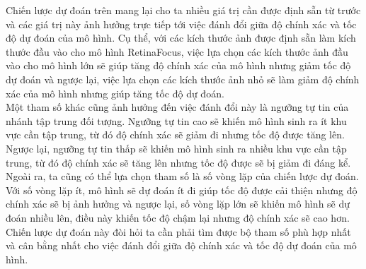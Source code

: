 {    \noindent
    Chiến lược dự đoán trên mang lại cho ta nhiều giá trị cần được định sẵn từ trước và các giá trị này ảnh hưởng trực tiếp tới việc đánh đổi giữa độ chính xác và tốc độ dự đoán của mô hình.
    Cụ thể, với các kích thước ảnh được định sẵn làm kích thước đầu vào cho mô hình RetinaFocus, việc lựa chọn các kích thước ảnh đầu vào cho mô hình lớn sẽ giúp tăng độ chính xác của mô hình nhưng giảm tốc độ dự đoán và ngược lại, việc lựa chọn các kích thước ảnh nhỏ sẽ làm giảm độ chính xác của mô hình nhưng giúp tăng tốc độ dự đoán. \\
    Một tham số khác cũng ảnh hưởng đến việc đánh đổi này là ngưỡng tự tin của nhánh tập trung đối tượng.
    Ngưỡng tự tin cao sẽ khiến mô hình sinh ra ít khu vực cần tập trung, từ đó độ chính xác sẽ giảm đi nhưng tốc độ được tăng lên.
    Ngược lại, ngưỡng tự tin thấp sẽ khiến mô hình sinh ra nhiều khu vực cần tập trung, từ đó độ chính xác sẽ tăng lên nhưng tốc độ được sẽ bị giảm đi đáng kể. \\
    Ngoài ra, ta cũng có thể lựa chọn tham số là số vòng lặp của chiến lược dự đoán.
    Với số vòng lặp ít, mô hình sẽ dự đoán ít đi giúp tốc độ được cải thiện nhưng độ chính xác sẽ bị ảnh hưởng và ngược lại, số vòng lặp lớn sẽ khiến mô hình sẽ dự đoán nhiều lên, điều này khiến tốc độ chậm lại nhưng độ chính xác sẽ cao hơn. \\
    Chiến lược dự đoán này đòi hỏi ta cần phải tìm được bộ tham số phù hợp nhất và cân bằng nhất cho việc đánh đổi giữa độ chính xác và tốc độ dự đoán của mô hình.
}